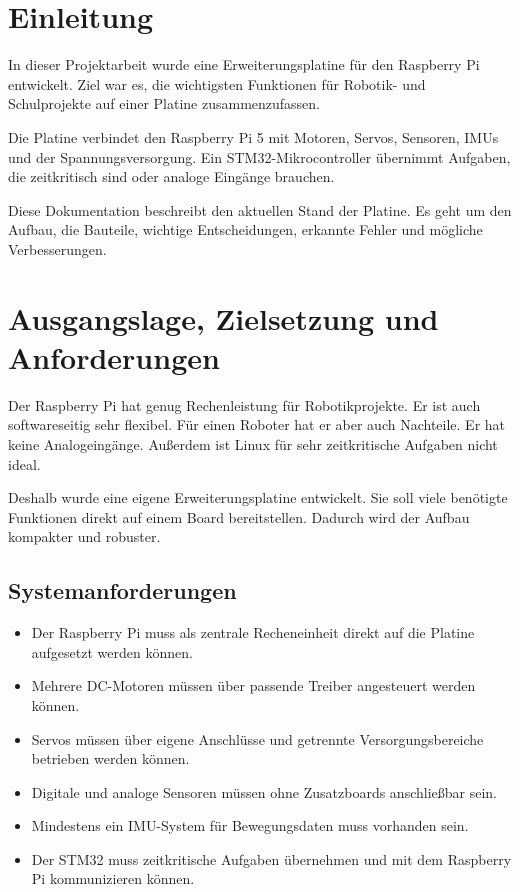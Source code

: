 \section{Einleitung}
In dieser Projektarbeit wurde eine Erweiterungsplatine für den Raspberry Pi entwickelt. Ziel war es, die wichtigsten Funktionen für Robotik- und Schulprojekte auf einer Platine zusammenzufassen.

Die Platine verbindet den Raspberry Pi 5 mit Motoren, Servos, Sensoren, IMUs und der Spannungsversorgung. Ein STM32-Mikrocontroller übernimmt Aufgaben, die zeitkritisch sind oder analoge Eingänge brauchen.

Diese Dokumentation beschreibt den aktuellen Stand der Platine. Es geht um den Aufbau, die Bauteile, wichtige Entscheidungen, erkannte Fehler und mögliche Verbesserungen.

\section{Ausgangslage, Zielsetzung und Anforderungen}
Der Raspberry Pi hat genug Rechenleistung für Robotikprojekte. Er ist auch softwareseitig sehr flexibel. Für einen Roboter hat er aber auch Nachteile. Er hat keine Analogeingänge. Außerdem ist Linux für sehr zeitkritische Aufgaben nicht ideal.

Deshalb wurde eine eigene Erweiterungsplatine entwickelt. Sie soll viele benötigte Funktionen direkt auf einem Board bereitstellen. Dadurch wird der Aufbau kompakter und robuster.


\subsection{Systemanforderungen}
\begin{itemize}
	\item Der Raspberry Pi muss als zentrale Recheneinheit direkt auf die Platine aufgesetzt werden können.
	\item Mehrere DC-Motoren müssen über passende Treiber angesteuert werden können.
	\item Servos müssen über eigene Anschlüsse und getrennte Versorgungsbereiche betrieben werden können.
	\item Digitale und analoge Sensoren müssen ohne Zusatzboards anschließbar sein.
	\item Mindestens ein IMU-System für Bewegungsdaten muss vorhanden sein.
	\item Der STM32 muss zeitkritische Aufgaben übernehmen und mit dem Raspberry Pi kommunizieren können.
\end{itemize}

